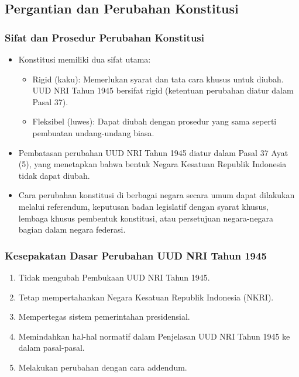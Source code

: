 \subsection{Pergantian dan Perubahan Konstitusi}

\subsubsection{Sifat dan Prosedur Perubahan Konstitusi}
\begin{itemize}
\item Konstitusi memiliki dua sifat utama:
  \begin{itemize}
  \item Rigid (kaku): Memerlukan syarat dan tata cara khusus untuk diubah. UUD NRI Tahun 1945 bersifat rigid (ketentuan perubahan diatur dalam Pasal 37).
  \item Fleksibel (luwes): Dapat diubah dengan prosedur yang sama seperti pembuatan undang-undang biasa.
  \end{itemize}
\item Pembatasan perubahan UUD NRI Tahun 1945 diatur dalam Pasal 37 Ayat (5), yang menetapkan bahwa bentuk Negara Kesatuan Republik Indonesia tidak dapat diubah.
\item Cara perubahan konstitusi di berbagai negara secara umum dapat dilakukan melalui referendum, keputusan badan legislatif dengan syarat khusus, lembaga khusus pembentuk konstitusi, atau persetujuan negara-negara bagian dalam negara federasi.
\end{itemize}

\subsubsection{Kesepakatan Dasar Perubahan UUD NRI Tahun 1945}
\begin{enumerate}
\item Tidak mengubah Pembukaan UUD NRI Tahun 1945.
\item Tetap mempertahankan Negara Kesatuan Republik Indonesia (NKRI).
\item Mempertegas sistem pemerintahan presidensial.
\item Memindahkan hal-hal normatif dalam Penjelasan UUD NRI Tahun 1945 ke dalam pasal-pasal.
\item Melakukan perubahan dengan cara addendum.
\end{enumerate}

